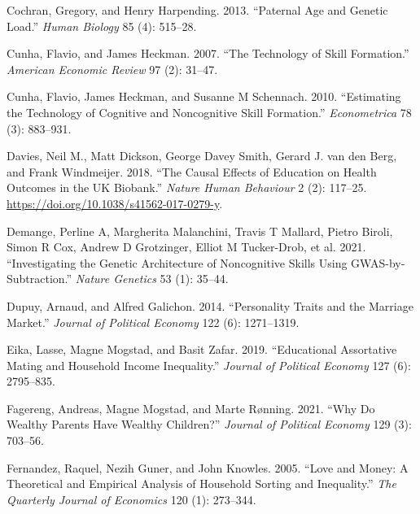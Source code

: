\documentclass[
]{article}
\newlength{\cslhangindent}
\newlength{\cslentryspacingunit} %
\newenvironment{CSLReferences}[2] %
 {%
  \setlength{\parindent}{0pt}
  \ifodd #1
  \let\oldpar\par
  \def\par{\hangindent=\cslhangindent\oldpar}
  \fi
  \setlength{\parskip}{#2\cslentryspacingunit}
 }%
 {}
\theoremstyle{definition}
\theoremstyle{definition}
\theoremstyle{definition}
\theoremstyle{definition}
\theoremstyle{remark}
\begin{document}
\begin{CSLReferences}{1}{0}
\leavevmode{}%
Cochran, Gregory, and Henry Harpending. 2013. {``Paternal Age and Genetic Load.''} \emph{Human Biology} 85 (4): 515--28.

\leavevmode{}%
Cunha, Flavio, and James Heckman. 2007. {``The Technology of Skill Formation.''} \emph{American Economic Review} 97 (2): 31--47.

\leavevmode{}%
Cunha, Flavio, James Heckman, and Susanne M Schennach. 2010. {``Estimating the Technology of Cognitive and Noncognitive Skill Formation.''} \emph{Econometrica} 78 (3): 883--931.

\leavevmode{}%
Davies, Neil M., Matt Dickson, George Davey Smith, Gerard J. van den Berg, and Frank Windmeijer. 2018. {``The Causal Effects of Education on Health Outcomes in the {UK} Biobank.''} \emph{Nature Human Behaviour} 2 (2): 117--25. \url{https://doi.org/10.1038/s41562-017-0279-y}.

\leavevmode{}%
Demange, Perline A, Margherita Malanchini, Travis T Mallard, Pietro Biroli, Simon R Cox, Andrew D Grotzinger, Elliot M Tucker-Drob, et al. 2021. {``Investigating the Genetic Architecture of Noncognitive Skills Using GWAS-by-Subtraction.''} \emph{Nature Genetics} 53 (1): 35--44.

\leavevmode{}%
Dupuy, Arnaud, and Alfred Galichon. 2014. {``Personality Traits and the Marriage Market.''} \emph{Journal of Political Economy} 122 (6): 1271--1319.

\leavevmode{}%
Eika, Lasse, Magne Mogstad, and Basit Zafar. 2019. {``Educational Assortative Mating and Household Income Inequality.''} \emph{Journal of Political Economy} 127 (6): 2795--835.

\leavevmode{}%
Fagereng, Andreas, Magne Mogstad, and Marte Rønning. 2021. {``Why Do Wealthy Parents Have Wealthy Children?''} \emph{Journal of Political Economy} 129 (3): 703--56.

\leavevmode{}%
Fernandez, Raquel, Nezih Guner, and John Knowles. 2005. {``Love and Money: A Theoretical and Empirical Analysis of Household Sorting and Inequality.''} \emph{The Quarterly Journal of Economics} 120 (1): 273--344.


\end{CSLReferences}
\end{document}
